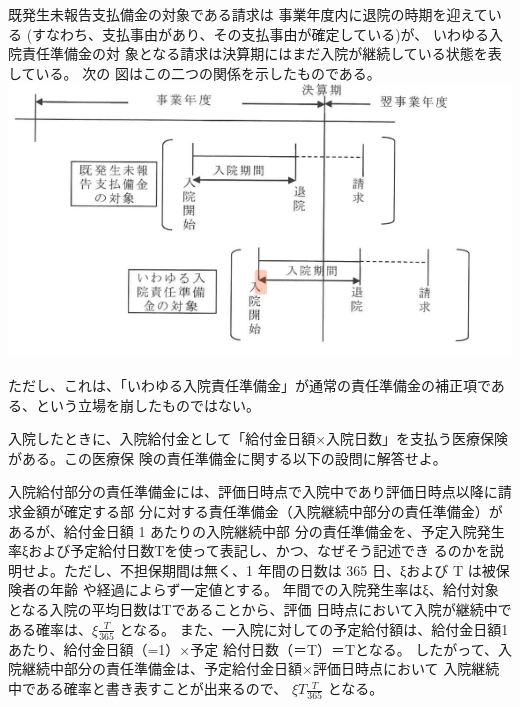\documentclass[report,gutter=10mm,fore-edge=10mm,uplatex,dvipdfmx]{jlreq}
\begin{document}
既発生未報告支払備金の対象である請求は
事業年度内に退院の時期を迎えている
(すなわち、支払事由があり、その支払事由が確定している)が、
いわゆる入院責任準備金の対
象となる請求は決算期にはまだ入院が継続している状態を表している。
次の
図はこの二つの関係を示したものである。
\includegraphics[scale=0.8]{images/ProbH5-1-1-1.png}

ただし、これは、「いわゆる入院責任準備金」が通常の責任準備金の補正項である、という立場を崩したものではない。

入院したときに、入院給付金として「給付金日額×入院日数」を支払う医療保険がある。この医療保
険の責任準備金に関する以下の設問に解答せよ。

入院給付部分の責任準備金には、評価日時点で入院中であり評価日時点以降に請求金額が確定する部
分に対する責任準備金（入院継続中部分の責任準備金）があるが、給付金日額 1 あたりの入院継続中部
分の責任準備金を、予定入院発生率ξおよび予定給付日数Tを使って表記し、かつ、なぜそう記述でき
るのかを説明せよ。ただし、不担保期間は無く、1 年間の日数は 365 日、ξおよび T は被保険者の年齢
や経過によらず一定値とする。
年間での入院発生率はξ、給付対象となる入院の平均日数はTであることから、評価
日時点において入院が継続中である確率は、$\xi \frac{T}{365}$ となる。
また、一入院に対しての予定給付額は、給付金日額1あたり、給付金日額（=1）×予定
給付日数（＝T）＝Tとなる。
したがって、入院継続中部分の責任準備金は、予定給付金日額×評価日時点において
入院継続中である確率と書き表すことが出来るので、
$\xi T\frac{T}{365}$ となる。

\end{document}
